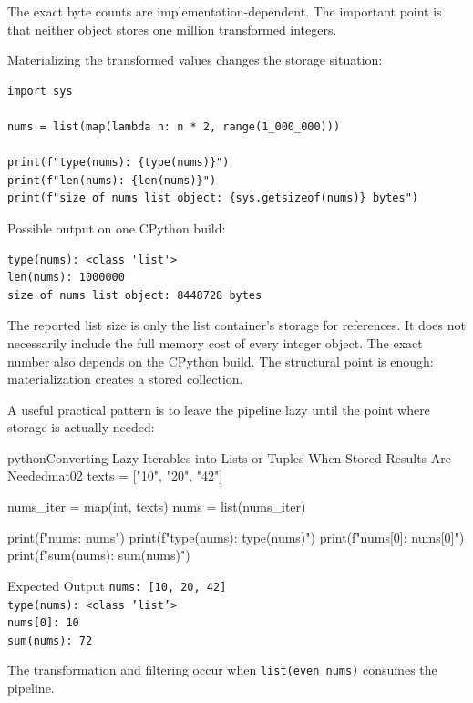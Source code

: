 The exact byte counts are implementation-dependent. The important point is that neither object stores one million transformed integers.

Materializing the transformed values changes the storage situation:

\begin{verbatim}
import sys

nums = list(map(lambda n: n * 2, range(1_000_000)))

print(f"type(nums): {type(nums)}")
print(f"len(nums): {len(nums)}")
print(f"size of nums list object: {sys.getsizeof(nums)} bytes")
\end{verbatim}

Possible output on one CPython build:

\begin{verbatim}
type(nums): <class 'list'>
len(nums): 1000000
size of nums list object: 8448728 bytes
\end{verbatim}

The reported list size is only the list container's storage for references. It does not necessarily include the full memory cost of every integer object. The exact number also depends on the CPython build. The structural point is enough: materialization creates a stored collection.

A useful practical pattern is to leave the pipeline lazy until the point where storage is actually needed:

\begin{codebox}[]{python}{Converting Lazy Iterables into Lists or Tuples When Stored Results Are Needed}{mat02}
texts = ["10", "20", "42"]

nums_iter = map(int, texts)
nums = list(nums_iter)

print(f"nums: {nums}")
print(f"type(nums): {type(nums)}")
print(f"nums[0]: {nums[0]}")
print(f"sum(nums): {sum(nums)}")
\end{codebox}


\begin{iobox}{Expected Output}
\texttt{nums: [10, 20, 42]} \\
\texttt{type(nums): <class 'list'>} \\
\texttt{nums[0]: 10} \\
\texttt{sum(nums): 72} \\
\end{iobox}




The transformation and filtering occur when \texttt{list(even\_nums)} consumes the pipeline.


